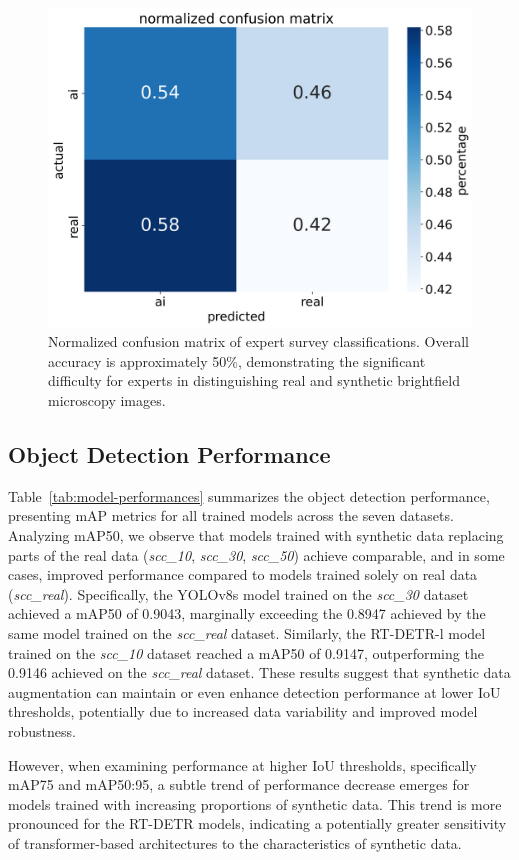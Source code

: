 \begin{figure}[t]
    \centering
    \includegraphics[width=0.75\linewidth]{images/norm_confusion_matrix}
    \caption{Normalized confusion matrix of expert survey classifications. Overall accuracy is approximately 50\%, demonstrating the significant difficulty for experts in distinguishing real and synthetic brightfield microscopy images.}
    \label{fig:conf_matrix}
\end{figure}

\subsection{Object Detection Performance}
\label{subsec:object-detection-performance}
Table~\ref{tab:model-performances} summarizes the object detection performance, presenting mAP metrics for all trained models across the seven datasets.
Analyzing mAP\@50, we observe that models trained with synthetic data replacing parts of the real data (\textit{scc\_10}, \textit{scc\_30}, \textit{scc\_50}) achieve comparable, and in some cases, improved performance compared to models trained solely on real data (\textit{scc\_real}).
Specifically, the YOLOv8s model trained on the \textit{scc\_30} dataset achieved a mAP\@50 of 0.9043, marginally exceeding the 0.8947 achieved by the same model trained on the \textit{scc\_real} dataset.
Similarly, the RT-DETR-l model trained on the \textit{scc\_10} dataset reached a mAP\@50 of 0.9147, outperforming the 0.9146 achieved on the \textit{scc\_real} dataset.
These results suggest that synthetic data augmentation can maintain or even enhance detection performance at lower IoU thresholds, potentially due to increased data variability and improved model robustness.

However, when examining performance at higher IoU thresholds, specifically mAP\@75 and mAP\@50:95, a subtle trend of performance decrease emerges for models trained with increasing proportions of synthetic data.
This trend is more pronounced for the RT-DETR models, indicating a potentially greater sensitivity of transformer-based architectures to the characteristics of synthetic data.

